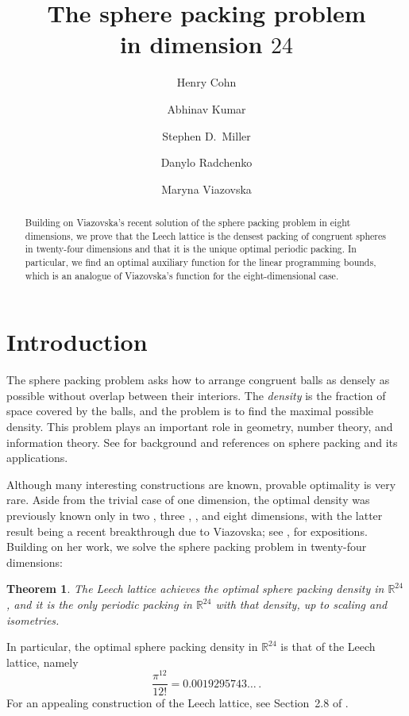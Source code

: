 \documentclass{aomart}
\title[The sphere packing problem in dimension $24$]{The sphere packing problem\\ in dimension $24$}
\author[Cohn]{Henry Cohn}
\author[Kumar]{Abhinav Kumar}
\author[Miller]{Stephen D.\ Miller}
\author[Radchenko]{Danylo Radchenko}
\author[Viazovska]{Maryna Viazovska}
\theoremstyle{plain}
\newtheorem{theorem}{Theorem}
\numberwithin{theorem}{section}
\numberwithin{equation}{section}
\newcommand{\R}{{\mathbb R}}
\begin{document}
\begin{abstract}
Building on Viazovska's recent solution of the sphere packing problem in
eight dimensions, we prove that the Leech lattice is the densest packing of
congruent spheres in twenty-four dimensions and that it is the unique
optimal periodic packing.  In particular, we find an optimal auxiliary
function for the linear programming bounds, which is an analogue of
Viazovska's function for the eight-dimensional case.
\end{abstract}

\maketitle

\section{Introduction}

The sphere packing problem asks how to arrange congruent balls as
\mbox{densely} as possible without overlap between their interiors.  The
\emph{density} is the fraction of space covered by the balls, and the problem
is to find the maximal possible density.  This problem plays an important
role in geometry, number theory, and information theory. See \cite{SPLAG} for
background and references on sphere packing and its applications.

Although many interesting constructions are known, provable optimality is
very rare.  Aside from the trivial case of one dimension, the optimal density
was previously known only in two \cite{T}, three \cite{H}, \cite{FPK}, and
eight \cite{V} dimensions, with the latter result being a recent breakthrough
due to Viazovska; see \cite{C}, \cite{dLV} for expositions. Building on her
work, we solve the sphere packing problem in twenty-four dimensions:

\begin{theorem}\label{thm:main}
The Leech lattice achieves the optimal sphere packing density in $\R^{24}$,
and it is the only periodic packing in $\R^{24}$ with that density, up to
scaling and isometries.
\end{theorem}

In particular, the optimal sphere packing density in $\R^{24}$ is that of
the Leech lattice, namely
\[
\frac{\pi^{12}}{12!} = 0.0019295743\dots\,.
\]
For an appealing construction of the Leech lattice, see Section~2.8 of
\cite{E}.
\end{document}
